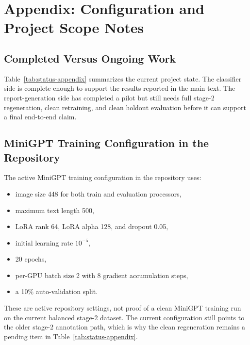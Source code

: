 \appendix

\section{Appendix: Configuration and Project Scope Notes}

\subsection{Completed Versus Ongoing Work}

Table~\ref{tab:status-appendix} summarizes the current project state. The classifier side is complete enough to support the results reported in the main text. The report-generation side has completed a pilot but still needs full stage-2 regeneration, clean retraining, and clean holdout evaluation before it can support a final end-to-end claim.

\begin{table}[H]
\centering
\caption{Current project status summary.}
\label{tab:status-appendix}

\end{table}

\subsection{MiniGPT Training Configuration in the Repository}

The active MiniGPT training configuration in the repository uses:
\begin{itemize}[leftmargin=1.3em]
\item image size 448 for both train and evaluation processors,
\item maximum text length 500,
\item LoRA rank 64, LoRA alpha 128, and dropout 0.05,
\item initial learning rate \(10^{-5}\),
\item 20 epochs,
\item per-GPU batch size 2 with 8 gradient accumulation steps,
\item a 10\% auto-validation split.
\end{itemize}

These are active repository settings, not proof of a clean MiniGPT training run on the current balanced stage-2 dataset. The current configuration still points to the older stage-2 annotation path, which is why the clean regeneration remains a pending item in Table~\ref{tab:status-appendix}.

